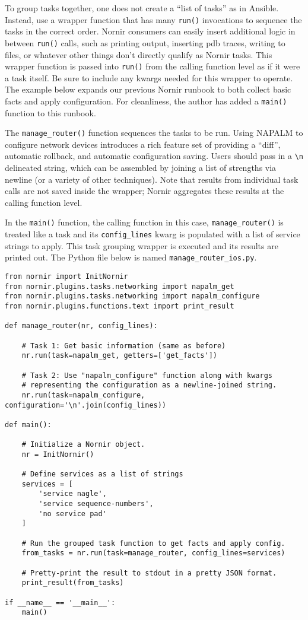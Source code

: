 To group tasks together, one does not create a ``list of tasks'' as in
Ansible. Instead, use a wrapper function that has many \verb|run()| invocations to
sequence the tasks in the correct order. Nornir consumers can easily insert
additional logic in between \verb|run()| calls, such as printing output, inserting
pdb traces, writing to files, or whatever other things don't directly qualify
as Nornir tasks. This wrapper function is passed into \verb|run()| from the calling
function level as if it were a task itself. Be sure to include any kwargs
needed for this wrapper to operate. The example below expands our previous
Nornir runbook to both collect basic facts and apply configuration. For
cleanliness, the author has added a \verb|main()| function to this runbook.

The \verb|manage_router()| function sequences the tasks to be run. Using
NAPALM to configure network devices introduces a rich feature set of providing
a ``diff'', automatic rollback, and automatic configuration saving. Users
should pass in a \verb|\n| delineated string, which can be assembled by joining a
list of strengths via newline (or a variety of other techniques). Note that
results from individual task calls are not saved inside the wrapper; Nornir
aggregates these results at the calling function level.

In the \verb|main()| function, the calling function in this case,
\verb|manage_router()| is treated like a task and its \verb|config_lines|
kwarg is populated with a list of service strings to apply. This task grouping
wrapper is executed and its results are printed out. The Python file below
is named \verb|manage_router_ios.py|.

\begin{verbatim}
from nornir import InitNornir
from nornir.plugins.tasks.networking import napalm_get
from nornir.plugins.tasks.networking import napalm_configure
from nornir.plugins.functions.text import print_result

def manage_router(nr, config_lines):

    # Task 1: Get basic information (same as before)
    nr.run(task=napalm_get, getters=['get_facts'])

    # Task 2: Use "napalm_configure" function along with kwargs
    # representing the configuration as a newline-joined string.
    nr.run(task=napalm_configure, configuration='\n'.join(config_lines))

def main():

    # Initialize a Nornir object.
    nr = InitNornir()

    # Define services as a list of strings
    services = [
        'service nagle',
        'service sequence-numbers',
        'no service pad'
    ]

    # Run the grouped task function to get facts and apply config.
    from_tasks = nr.run(task=manage_router, config_lines=services)

    # Pretty-print the result to stdout in a pretty JSON format.
    print_result(from_tasks)

if __name__ == '__main__':
    main()
\end{verbatim}

